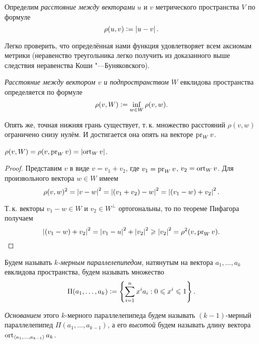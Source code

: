 \begin{definition}
    Определим \textit{расстояние между векторами} $u$ и $v$ метрического пространства $V$ по формуле
    \[
        \rho(u, v) \vcentcolon = \left\lvert u - v\right\rvert.
    \]
\end{definition}

Легко проверить, что определённая нами функция удовлетворяет всем аксиомам метрики (неравенство треугольника легко получить из доказанного выше следствия неравенства Коши "---Буняковского).

\begin{definition}
    \textit{Расстояние между вектором $v$ и подпространством $W$} евклидова пространства определяется по формуле
    \[
        \rho(v, W) \vcentcolon = \inf\limits_{w \in W}\rho(v, w).
    \]
\end{definition}

Опять же, точная нижняя грань существует, т.\,к. множество расстояний $\rho(v, w)$ ограничено снизу нулём. И достигается она опять на векторе $\operatorname{pr}_Wv$.

\begin{proposal}
    $\rho(v, W) = \rho(v, \operatorname{pr}_Wv) = \left\lvert\operatorname{ort}_Wv\right\rvert$.
\end{proposal}

\begin{proof}
    Представим $v$ в виде $v = v_1 + v_2$, где $v_1 = \operatorname{pr}_Wv$, $v_2 = \operatorname{ort}_Wv$. Для произвольного вектора $w \in W$ имеем
    \[
        \rho(v, w)^2 = \left\lvert v - w\right\rvert^2 = \left\lvert(v_1 + v_2) - w\right\rvert^2 = \left\lvert(v_1 - w) + v_2\right\rvert^2.
    \]

    Т.\,к. векторы $v_1 - w \in W$ и $v_2 \in W^\perp$ ортогональны, то по теореме Пифагора получаем
    \[
        \left\lvert(v_1 - w) + v_2\right\rvert^2 = \left\lvert v_1 - u\right\rvert^2 + \left\lvert v_2\right\rvert^2 \geqslant \left\lvert v_2\right\rvert^2 = \rho^2(v, \operatorname{pr}_Wv).
    \]
\end{proof}

\begin{definition}
    Будем называть \textit{$k$-мерным параллелепипедом}, натянутым на вектора $a_1, \ldots, a_k$ евклидова пространства, будем называть множество
    \[
        \Pi(a_1, \ldots, a_k) \vcentcolon = \left\{\sum_{i = 1}^nx^ia_i : 0 \leqslant x^i \leqslant 1\right\}.
    \]

    \textit{Основанием} этого $k$-мерного параллелепипеда будем называть $(k - 1)$-мерный параллелепипед $\Pi(a_1, \ldots, a_{k - 1})$, а его \textit{высотой} будем называть длину вектора $\operatorname{ort}_{\langle a_1, \ldots, a_{k - 1}\rangle}a_k$.
\end{definition}


